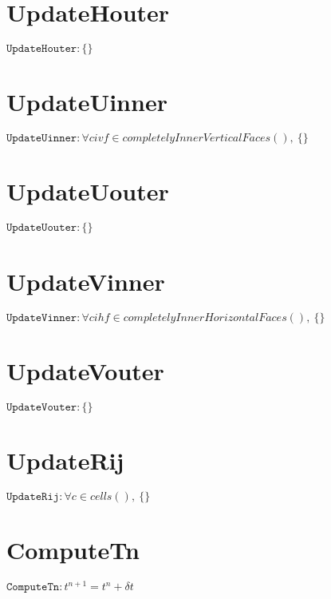 \documentclass[11pt]{article}
\begin{document}
\section{UpdateHouter}
$\texttt{UpdateHouter} : \{ \}$


\section{UpdateUinner}
$\texttt{UpdateUinner} : \forall{civf\in completelyInnerVerticalFaces()}, \ \{ \}$


\section{UpdateUouter}
$\texttt{UpdateUouter} : \{ \}$


\section{UpdateVinner}
$\texttt{UpdateVinner} : \forall{cihf\in completelyInnerHorizontalFaces()}, \ \{ \}$


\section{UpdateVouter}
$\texttt{UpdateVouter} : \{ \}$


\section{UpdateRij}
$\texttt{UpdateRij} : \forall{c\in cells()}, \ \{ \}$


\section{ComputeTn}
$\texttt{ComputeTn} : t^{n+1} = t^{n} + δt$
\end{document}
